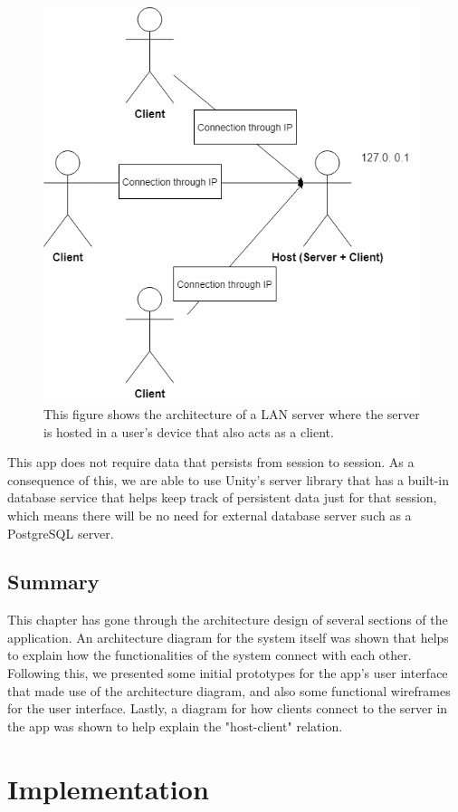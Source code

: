 \documentclass{dissertation}
\begin{document}
\begin{figure}[H]
\centering
\includegraphics[width = 11cm]{images/server_architecture.png}
\caption{This figure shows the architecture of a LAN server where the server is hosted in a user's device that also acts as a client.}
\label{fig:server-arch}
\end{figure}

This app does not require data that persists from session to session. As a consequence of this, we are able to use Unity's server library that has a built-in database service that helps keep track of persistent data just for that session, which means there will be no need for external database server such as a PostgreSQL server.
\pagebreak

\section{Summary}
 This chapter has gone through the architecture design of several sections of the application. An architecture diagram for the system itself was shown that helps to explain how the functionalities of the system connect with each other. Following this, we presented some initial prototypes for the app's user interface that made use of the architecture diagram, and also some functional wireframes for the user interface. Lastly, a diagram for how clients connect to the server in the app was shown to help explain the "host-client" relation.

\chapter{Implementation}
\end{document}
